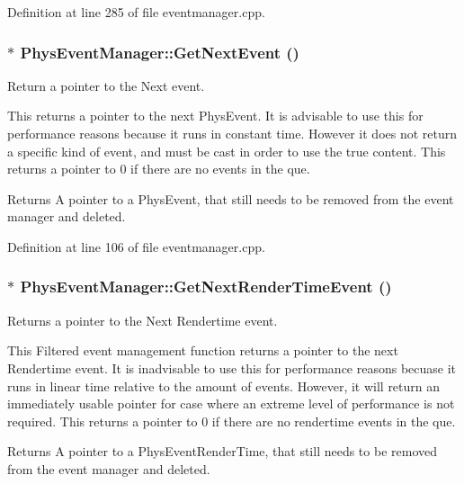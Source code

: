 Definition at line 285 of file eventmanager.cpp.

\hypertarget{classPhysEventManager_a1ab0da9e37f43c2c0d5af1dae26dcaf2}{
\subsubsection[{GetNextEvent}]{ $\ast$ PhysEventManager::GetNextEvent ()}}
\label{d5/dd7/classPhysEventManager_a1ab0da9e37f43c2c0d5af1dae26dcaf2}


Return a pointer to the Next event. 

This returns a pointer to the next PhysEvent. It is advisable to use this for performance reasons because it runs in constant time. However it does not return a specific kind of event, and must be cast in order to use the true content. This returns a pointer to 0 if there are no events in the que. \begin{DoxyReturn}{Returns}
A pointer to a PhysEvent, that still needs to be removed from the event manager and deleted. 
\end{DoxyReturn}


Definition at line 106 of file eventmanager.cpp.

\hypertarget{classPhysEventManager_ae1276d993b2892048341205ae0e8de02}{
\subsubsection[{GetNextRenderTimeEvent}]{ $\ast$ PhysEventManager::GetNextRenderTimeEvent ()}}
\label{d5/dd7/classPhysEventManager_ae1276d993b2892048341205ae0e8de02}


Returns a pointer to the Next Rendertime event. 

This Filtered event management function returns a pointer to the next Rendertime event. It is inadvisable to use this for performance reasons becuase it runs in linear time relative to the amount of events. However, it will return an immediately usable pointer for case where an extreme level of performance is not required. This returns a pointer to 0 if there are no rendertime events in the que. \begin{DoxyReturn}{Returns}
A pointer to a PhysEventRenderTime, that still needs to be removed from the event manager and deleted. 
\end{DoxyReturn}


